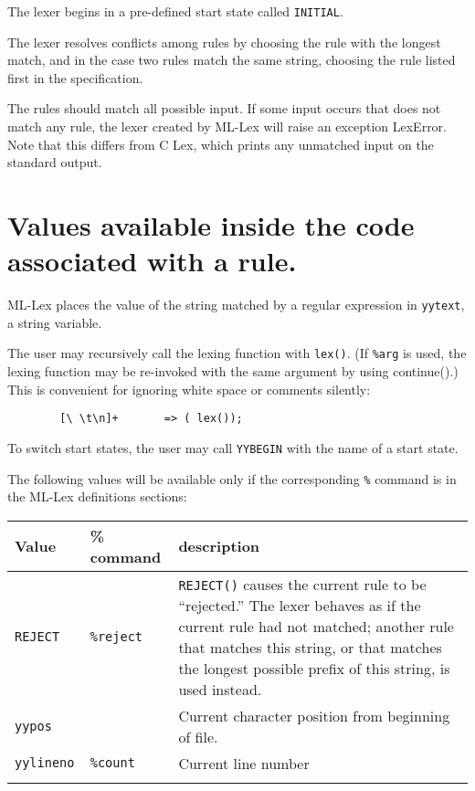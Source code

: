 \documentclass{article}
\begin{document}
The lexer begins in a pre-defined start state called \verb|INITIAL|.

The lexer resolves conflicts among rules by choosing the rule with
the longest match, and in the case two rules match the same string,
choosing the rule listed first in the specification.

The rules should match all possible input.  If some input occurs that
does not match any rule, the lexer created by ML-Lex will raise an
exception LexError.  Note that this differs from C Lex, which prints
any unmatched input on the standard output.

\section{Values available inside the code associated with a rule.}
\label{avail}

ML-Lex places the value of the string matched by a regular expression
in \verb|yytext|, a string variable.  

The user may recursively
call the lexing function with \verb|lex()|.  (If \verb|%arg| is used, the
lexing function may be re-invoked with the same argument by using
continue().) This is convenient for ignoring white space or comments silently:

\begin{verbatim}
        [\ \t\n]+       => ( lex());
\end{verbatim}

To switch start states, the user may call \verb|YYBEGIN| with the name of a
start state.

The following values will be available only if the corresponding \verb|%|
command is in the ML-Lex definitions sections:

\begin{tabular}{lll}
\\
{\bf Value}&{\bf \% command}&{\bf description}\\
\hline
{\tt REJECT} &{\tt\%reject}&\parbox[t]{2.6in}{{\tt REJECT()} causes the current
					rule to be ``rejected.''
					The lexer behaves as if the
					current rule had not matched;
					another rule that matches this
					string, or that matches the longest
					possible prefix of this string,
					is used instead.} \\
{\tt yypos} & & Current character position from
					beginning of file.\\
{\tt yylineno } & {\tt \%count} &         Current line number\\
\\
\end{tabular}
        
\end{document}
